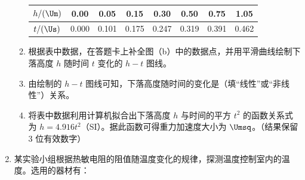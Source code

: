\documentclass[\gkver]{gaokaozhenti}
\begin{document}
\begin{enumerate}
\begin{enumerate}
	\begin{center}
	\begin{tabular}{|c|c|c|c|c|c|c|c|}
	\hline
	$h/(\Um)$ & 0.00 & 0.05 & 0.15 & 0.30 & 0.50 & 0.75 & 1.05 \\
	\hline
	$t/(\Us)$ & 0.000 & 0.101 & 0.175 & 0.247 & 0.319 & 0.391 & 0.462 \\
	\hline
	\end{tabular}
	\end{center}
	\item
	根据表中数据，在答题卡上补全图（b）中的数据点，并用平滑曲线绘制下落高度 $h$ 随时间 $t$ 变化的 $h - t$ 图线\tkanswer{}。
	\item
	由绘制的 $h - t$ 图线可知，下落高度随时间的变化是（填“线性”或“非线性”）关系。
	\item
	将表中数据利用计算机拟合出下落高度 $h$ 与时间的平方 $t^{2}$ 的函数关系式为 $h = 4.916t^{2}$（SI）。据此函数可得重力加速度大小为 $\Umsq$。（结果保留 3 位有效数字）
\end{enumerate}


\item
某实验小组根据热敏电阻的阻值随温度变化的规律，探测温度控制室内的温度。选用的器材有：


\end{enumerate}
\end{document}
